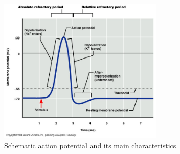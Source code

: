 \begin{figure}[!ht]
\centering
\includegraphics[width=0.7\textwidth]{images/actionpotential.jpg}
\caption{Schematic action potential and its main characteristics}
\label{fig:actionpotential}
\end{figure}

